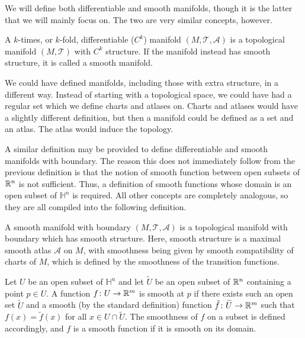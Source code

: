 \documentclass[a4paper,12pt]{article}
\begin{document}
We will define both differentiable and smooth manifolds, though it is the latter that we will mainly focus on.
The two are very similar concepts, however.
\begin{definition}\label{def:differentiable_and_smooth_manifold}
    A $k$-times, or $k$-fold, differentiable ($C^k$) manifold $(M, \mathcal{T}, \mathcal{A})$ is a topological manifold $(M, \mathcal{T})$ with $C^k$ structure.
    If the manifold instead has smooth structure, it is called a smooth manifold.
\end{definition}
\begin{remark}
    We could have defined manifolds, including those with extra structure, in a different way.
    Instead of starting with a topological space, we could have had a regular set which we define charts and atlases on.
    Charts and atlases would have a slightly different definition, but then a manifold could be defined as a set and an atlas.
    The atlas would induce the topology.
\end{remark}
A similar definition may be provided to define differentiable and smooth manifolds with boundary.
The reason this does not immediately follow from the previous definition is that the notion of smooth function between open subsets of $\mathbb{R}^n$ is not sufficient.
Thus, a definition of smooth functions whose domain is an open subset of $\mathbb{H}^n$ is required.
All other concepts are completely analogous, so they are all compiled into the following definition.
\begin{definition}
    A smooth manifold with boundary $(M, \mathcal{T}, \mathcal{A})$ is a topological manifold with boundary which has smooth structure.
    Here, smooth structure is a maximal smooth atlas $\mathcal{A}$ on $M$, with smoothness being given by smooth compatibility of charts of $M$, which is defined by the smoothness of the transition functions.
    
    Let $U$ be an open subset of $\mathbb{H}^n$ and let $\widetilde{U}$ be an open subset of $\mathbb{R}^n$ containing a point $p \in U$.
    A function $f \colon U \to \mathbb{R}^m$ is smooth at $p$ if there exists such an open set $\widetilde{U}$ and a smooth (by the standard definition) function $\tilde{f} \colon \widetilde{U} \to \mathbb{R}^m$ such that $f(x) = \tilde{f}(x)$ for all $x \in U \cap \widetilde{U}$.
    The smoothness of $f$ on a subset is defined accordingly, and $f$ is a smooth function if it is smooth on its domain.
\end{definition}
\end{document}
